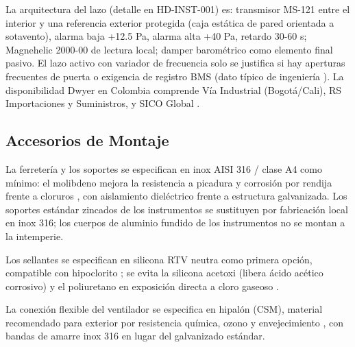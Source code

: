 La arquitectura del lazo (detalle en HD-INST-001) es: transmisor MS-121 entre el interior y una referencia exterior protegida (caja estática de pared orientada a sotavento), alarma baja +12.5 Pa, alarma alta +40 Pa, retardo 30-60 s; Magnehelic 2000-00 de lectura local; damper barométrico como elemento final pasivo. El lazo activo con variador de frecuencia solo se justifica si hay aperturas frecuentes de puerta o exigencia de registro BMS (dato típico de ingeniería \cite{aivc_7469}). La disponibilidad Dwyer en Colombia comprende Vía Industrial (Bogotá/Cali), RS Importaciones y Suministros, y SICO Global \cite{viaindustrial_dwyer}.

\subsection{Accesorios de Montaje}

La ferretería y los soportes se especifican en inox AISI 316 / clase A4 como mínimo: el molibdeno mejora la resistencia a picadura y corrosión por rendija frente a cloruros \cite{marsh_fasteners}, con aislamiento dieléctrico frente a estructura galvanizada. Los soportes estándar zincados de los instrumentos se sustituyen por fabricación local en inox 316; los cuerpos de aluminio fundido de los instrumentos no se montan a la intemperie.

Los sellantes se especifican en silicona RTV neutra como primera opción, compatible con hipoclorito \cite{rtv_silicone}; se evita la silicona acetoxi (libera ácido acético corrosivo) y el poliuretano en exposición directa a cloro gaseoso \cite{apache_pu}.

La conexión flexible del ventilador se especifica en hipalón (CSM), material recomendado para exterior por resistencia química, ozono y envejecimiento \cite{hardcast_hypalon}, con bandas de amarre inox 316 en lugar del galvanizado estándar.
